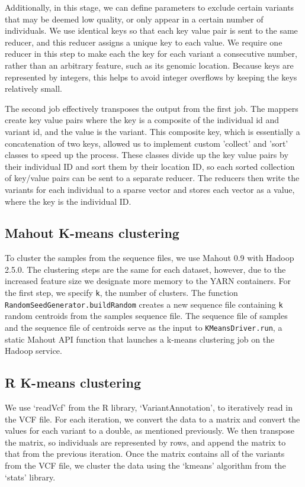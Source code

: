 \documentclass{bioinfo}
\begin{document}
\begin{methods}
Additionally, in this stage, we can define parameters to exclude certain variants that may be deemed low quality, or only appear in a certain number of individuals.
We use identical keys so that each key value pair is sent to the same reducer, and this reducer assigns a unique key to each value. We require one reducer in this step to make each the key for each variant a consecutive number, rather than an arbitrary feature, such as its genomic location. Because keys are represented by integers, this helps to avoid integer overflows by keeping the keys relatively small.

The second job effectively transposes the output from the first job. The mappers create key value pairs where the key is a composite of the individual id and variant id, and the value is the variant.
This composite key, which is essentially a concatenation of two keys, allowed us to implement custom 'collect' and 'sort' classes to speed up the process. These classes divide up the key value pairs by their individual ID and sort them by their location ID, so each sorted collection of key/value pairs can be sent to a separate reducer.
 The reducers then write the variants for each individual to a sparse vector and stores each vector as a value, where the key is the individual ID.


\subsection*{Mahout K-means clustering}
To cluster the samples from the sequence files, we use Mahout 0.9 with Hadoop 2.5.0. 
The clustering steps are the same for each dataset, however, due to the increased feature size we designate more memory to the
YARN containers. For the first step, we specify \texttt{k}, the number of clusters. The function \texttt{RandomSeedGenerator.buildRandom} creates a new sequence file containing \texttt{k}
random centroids from the samples sequence file. The sequence file
of samples and the sequence file of centroids serve as the input to \texttt{KMeansDriver.run}, a static Mahout API function that launches
a k-means clustering job on the Hadoop service. 


\subsection*{R K-means clustering}
We use `readVcf' from the R library, `VariantAnnotation', to iteratively read in the VCF file. For each iteration, we convert the data to a matrix and
convert the values for each variant to a double, as mentioned previously. We then transpose the matrix, so individuals are represented
by rows, and append the matrix to that from the previous iteration. Once the matrix contains all of the variants from the VCF file, we cluster the data
using the `kmeans' algorithm from the `stats' library.




\end{methods}
\end{document}
